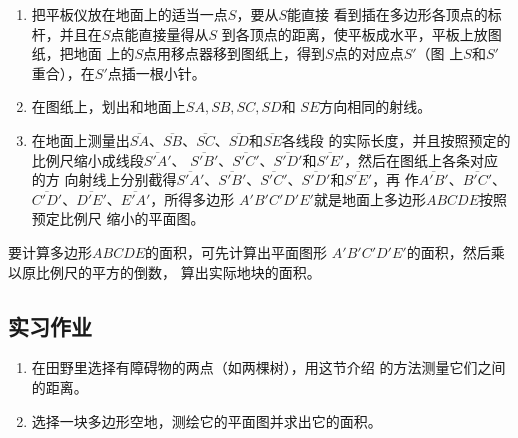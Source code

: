 \begin{enumerate}
    \item 把平板仪放在地面上的适当一点$S$，要从$S$能直接
看到插在多边形各顶点的标杆，并且在$S$点能直接量得从$S$
到各顶点的距离，使平板成水平，平板上放图纸，把地面
上的$S$点用移点器移到图纸上，得到$S$点的对应点$S'$（图
上$S$和$S'$重合），在$S'$点插一根小针。

\item 在图纸上，划出和地面上$SA,SB,SC,SD$和
$SE$方向相同的射线。
\item 在地面上测量出$\overline{SA}$、$\overline{SB}$、$\overline{SC}$、$\overline{SD}$和$\overline{SE}$各线段
的实际长度，并且按照预定的比例尺缩小成线段$\overline{S'A'}$、
$\overline{S'B'}$、$\overline{S'C'}$、$\overline{S'D'}$和$\overline{S'E'}$，然后在图纸上各条对应的方
向射线上分别截得$\overline{S'A'}$、$\overline{S'B'}$、$\overline{S'C'}$、$\overline{S'D'}$和$\overline{S'E'}$，再
作$\overline{A'B'}$、$\overline{B'C'}$、$\overline{C'D'}$、$\overline{D'E'}$、$\overline{E'A'}$，所得多边形
$A'B'C'D'E'$就是地面上多边形$ABCDE$按照预定比例尺
缩小的平面图。
\end{enumerate}

要计算多边形$ABCDE$的面积，可先计算出平面图形
$A'B'C'D'E'$的面积，然后乘以原比例尺的平方的倒数，
算出实际地块的面积。


\subsection*{实习作业}
\begin{enumerate}
    \item 在田野里选择有障碍物的两点（如两棵树），用这节介绍
    的方法测量它们之间的距离。
    \item 选择一块多边形空地，测绘它的平面图并求出它的面积。
\end{enumerate}


